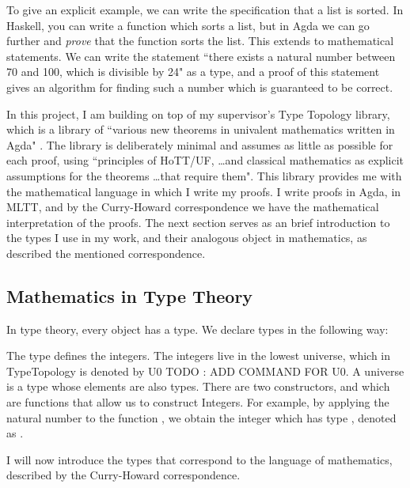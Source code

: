 \documentclass[ProjectReport]{subfiles}
\begin{document}
To give an explicit example, we can write the specification that a list is sorted. In Haskell, you can write a function which sorts a list, but in Agda we can go further and \textit{prove} that the function sorts the list. This extends to mathematical statements. We can write the statement ``there exists a natural number between 70 and 100, which is divisible by 24" as a type, and a proof of this statement gives an algorithm for finding such a number which is guaranteed to be correct.

In this project, I am building on top of my supervisor's Type Topology library, which is a library of ``various new theorems in univalent mathematics written in Agda" \cite{TypeTopology}. The library is deliberately minimal and assumes as little as possible for each proof, using ``principles of HoTT/UF, \ldots and classical mathematics as explicit assumptions for the theorems \ldots that require them". This library provides me with the mathematical language in which I write my proofs. I write proofs in Agda, in MLTT, and by the Curry-Howard correspondence we have the mathematical interpretation of the proofs.  The next section serves as an brief introduction to the types I use in my work, and their analogous object in mathematics, as described the mentioned correspondence.

\subsection{Mathematics in Type Theory}

In type theory, every object has a type. We declare types in the following way:

\TypeExample

The type  defines the integers. The integers live in the lowest universe, which in TypeTopology is denoted by U0 {TODO : ADD COMMAND FOR U0}. A universe is a type whose elements are also types. There are two constructors,  and  which are functions that allow us to construct Integers. For example, by applying the natural number  to the function , we obtain the integer \AgdaSpace{} which has type , denoted as
\AgdaSpace{}%
\AgdaSymbol{:}\AgdaSpace{}%
.

I will now introduce the types that correspond to the language of mathematics, described by the Curry-Howard correspondence. 
\end{document}
